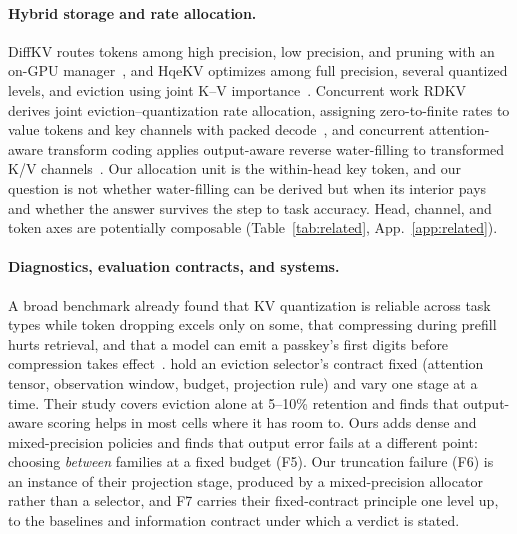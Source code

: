 \documentclass{article}
\theoremstyle{definition}
\begin{document}
\paragraph{Hybrid storage and rate allocation.}
DiffKV routes tokens among high precision, low precision, and pruning with an on-GPU manager~\citep{zhang2025diffkv}, and HqeKV optimizes among full precision, several quantized levels, and eviction using joint K--V importance~\citep{wang-etal-2026-hqekv}.  
Concurrent work RDKV derives joint eviction--quantization rate allocation, assigning zero-to-finite rates to value tokens and key channels with packed decode~\citep{zhang2026rdkv}, and concurrent attention-aware transform coding applies output-aware reverse water-filling to transformed K/V channels~\citep{laus2026aatc}.  
Our allocation unit is the within-head key token, and our question is not whether water-filling can be derived but when its interior pays and whether the answer survives the step to task accuracy. 
Head, channel, and token axes are potentially composable (Table~\ref{tab:related}, App.~\ref{app:related}).

\paragraph{Diagnostics, evaluation contracts, and systems.}
A broad benchmark already found that KV quantization is reliable across task types while token dropping excels only on some, that compressing during prefill hurts retrieval, 
and that a model can emit a passkey's first digits before compression takes effect~\citep{yuan2024kvbench}.  
\citet{zhang2026fixedcontract} hold an eviction selector's contract fixed (attention tensor, observation window, budget, projection rule) and vary one stage at a time. %
Their study covers eviction alone at 5--10\% retention and finds that output-aware scoring helps in most cells where it has room to.  
Ours adds dense and mixed-precision policies and finds that output error fails at a different point: 
choosing \emph{between} families at a fixed budget (F5).  
Our truncation failure (F6) is an instance of their projection stage, produced by a mixed-precision allocator rather than a selector, and F7 carries their fixed-contract principle one level up, to the baselines and information contract under which a verdict is stated.
\end{document}
